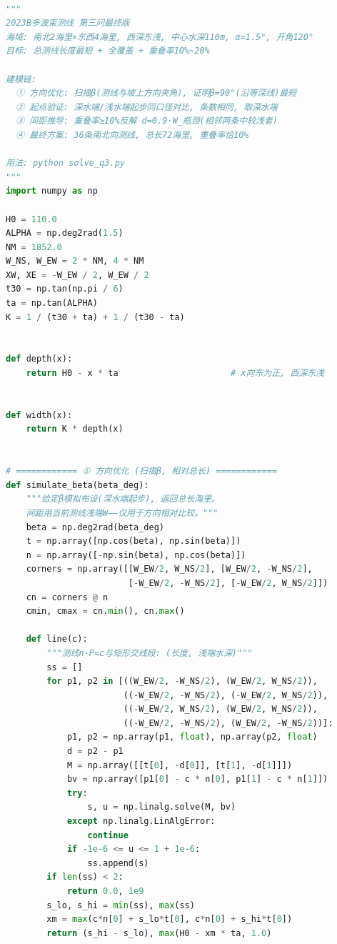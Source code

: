\documentclass[withoutpreface,bwprint]{cumcmthesis} %
\begin{document}
\begin{appendices}
\begin{lstlisting}[language=python]

"""
2023B多波束测线 第三问最终版
海域: 南北2海里×东西4海里, 西深东浅, 中心水深110m, α=1.5°, 开角120°
目标: 总测线长度最短 + 全覆盖 + 重叠率10%~20%

建模链:
  ① 方向优化: 扫描β(测线与坡上方向夹角), 证明β=90°(沿等深线)最短
  ② 起点验证: 深水端/浅水端起步同口径对比, 条数相同, 取深水端
  ③ 间距推导: 重叠率≥10%反解 d=0.9·W_瓶颈(相邻两条中较浅者)
  ④ 最终方案: 36条南北向测线, 总长72海里, 重叠率恰10%

用法: python solve_q3.py
"""
import numpy as np

H0 = 110.0
ALPHA = np.deg2rad(1.5)
NM = 1852.0
W_NS, W_EW = 2 * NM, 4 * NM
XW, XE = -W_EW / 2, W_EW / 2
t30 = np.tan(np.pi / 6)
ta = np.tan(ALPHA)
K = 1 / (t30 + ta) + 1 / (t30 - ta)


def depth(x):
    return H0 - x * ta                      # x向东为正, 西深东浅


def width(x):
    return K * depth(x)


# ============ ① 方向优化 (扫描β, 相对总长) ============
def simulate_beta(beta_deg):
    """给定β模拟布设(深水端起步), 返回总长海里。
    间距用当前测线浅端W——仅用于方向相对比较。"""
    beta = np.deg2rad(beta_deg)
    t = np.array([np.cos(beta), np.sin(beta)])
    n = np.array([-np.sin(beta), np.cos(beta)])
    corners = np.array([[W_EW/2, W_NS/2], [W_EW/2, -W_NS/2],
                        [-W_EW/2, -W_NS/2], [-W_EW/2, W_NS/2]])
    cn = corners @ n
    cmin, cmax = cn.min(), cn.max()

    def line(c):
        """测线n·P=c与矩形交线段: (长度, 浅端水深)"""
        ss = []
        for p1, p2 in [((W_EW/2, -W_NS/2), (W_EW/2, W_NS/2)),
                       ((-W_EW/2, -W_NS/2), (-W_EW/2, W_NS/2)),
                       ((-W_EW/2, W_NS/2), (W_EW/2, W_NS/2)),
                       ((-W_EW/2, -W_NS/2), (W_EW/2, -W_NS/2))]:
            p1, p2 = np.array(p1, float), np.array(p2, float)
            d = p2 - p1
            M = np.array([[t[0], -d[0]], [t[1], -d[1]]])
            bv = np.array([p1[0] - c * n[0], p1[1] - c * n[1]])
            try:
                s, u = np.linalg.solve(M, bv)
            except np.linalg.LinAlgError:
                continue
            if -1e-6 <= u <= 1 + 1e-6:
                ss.append(s)
        if len(ss) < 2:
            return 0.0, 1e9
        s_lo, s_hi = min(ss), max(ss)
        xm = max(c*n[0] + s_lo*t[0], c*n[0] + s_hi*t[0])
        return (s_hi - s_lo), max(H0 - xm * ta, 1.0)


\end{lstlisting}
\end{appendices}
\end{document}
